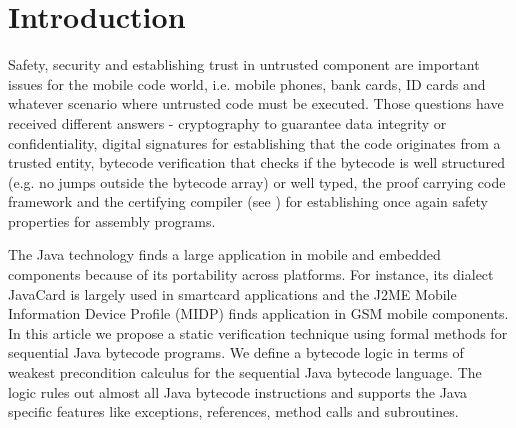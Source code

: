
\section{Introduction}\label{intro}
Safety, security and establishing trust in untrusted component are important issues for the mobile code world, 
i.e. mobile phones, bank cards, ID cards and whatever scenario where 
untrusted code must be executed. Those questions have received different answers - cryptography to guarantee data integrity or confidentiality,
 digital signatures for establishing that the code originates from a trusted entity, bytecode verification that checks if the bytecode 
 is well structured (e.g. no jumps outside the bytecode array) or well typed, 
 the proof carrying code framework  and the certifying compiler (see  \cite{ComNec,DesNecLee98}) for establishing once 
 again safety properties for assembly programs.  


The Java technology finds a large application in mobile and embedded components because of its portability across platforms. For instance, its dialect JavaCard is largely used in smartcard applications and the J2ME Mobile Information Device Profile (MIDP) finds application in GSM mobile components. 
  In this article we propose a static verification technique using formal methods for sequential Java bytecode programs.
We define a bytecode logic in terms of weakest precondition calculus for the sequential Java bytecode language. The logic rules out 
almost all Java bytecode instructions and supports the Java specific features like 
exceptions, references, method calls and subroutines.  
 
 
